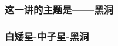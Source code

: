 \documentclass[CJK,13pt]{beamer}
\date{}
\begin{document}
  \bch

  \begin{frame}
    \frametitle{这一讲的主题是——黑洞}
  \end{frame}


  \begin{frame}
    \frametitle{白矮星-中子星-黑洞}
    
    
  \end{frame}
  
  

\ech
\end{document}
